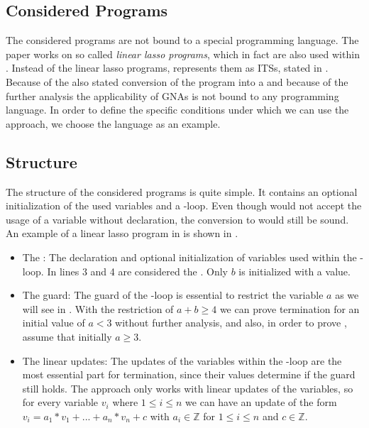 \subsection{Considered Programs}
The considered programs are not bound to a special programming language. The paper works on so called \textit{linear lasso programs}, which in fact are also used within \aprove. Instead of the linear lasso programs, \aprove represents them as ITSs, stated in . Because of the also stated conversion of the program into a \seg and because of the further analysis the applicability of GNAs is not bound to any programming language. \newline
In order to define the specific conditions under which we can use the approach, we choose the language  as an example.
\subsection{Structure}
\label{sec:structure}
The structure of the considered programs is quite simple. It contains an optional initialization  of the used variables and a -loop. Even though  would not accept the usage of a variable without declaration, the conversion to \llvm would still be sound. An example of a linear lasso program in  is shown in . 
\begin{itemize}
	\item The \stem: \newline
		The declaration and optional initialization of variables used within the -loop. In  lines 3 and 4 are considered the \stem. Only $b$ is initialized with a value.
	\item The guard: \newline
		The guard of the -loop is essential to restrict the variable $a$ as we will see in . With the restriction of $a+b\ge 4 $ we can prove termination for an initial value of $a < 3$ without further analysis, and also, in order to prove \nonterm, assume that initially $a \ge 3$.
	\item The linear updates: \newline
		The updates of the variables within the -loop are the most essential part for termination, since their values determine if the guard still holds. The approach only works with linear updates of the variables, so for every variable $v_i$ where $1\le i\le n$ we can have an update of the form $v_i=a_1*v_1+...+a_n*v_n+c$ with $a_i \in \mathbb{Z}$ for $1 \le i \le n$ and $c \in \mathbb{Z}$.
\end{itemize} 

